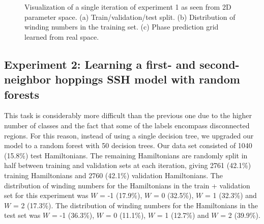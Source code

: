 \documentclass[fleqn,10pt]{wlscirep}
\begin{document}
\begin{figure}
\centering
{}\quad
{}
\caption{Visualization of a single iteration of experiment 1 as seen from 2D parameter space. (a) Train/validation/test split. (b) Distribution of winding numbers in the training set. (c) Phase prediction grid learned from real space.}
\label{figexp1_exp}
\end{figure}

\subsection*{Experiment 2: Learning a first- and second-neighbor hoppings SSH model with random forests}
\label{exp2}

This task is considerably more difficult than the previous one due to the higher number of classes and the fact that some of the labels encompass disconnected regions. For this reason, instead of using a single decision tree, we upgraded our model to a random forest \cite{Breiman2001} with 50 decision trees. Our data set consisted of 1040 (15.8\%) test Hamiltonians. The remaining Hamiltonians are randomly split in half between training and validation sets at each iteration, giving 2761 (42.1\%) training Hamiltonians and 2760 (42.1\%) validation Hamiltonians. The distribution of winding numbers for the Hamiltonians in the train + validation set for this experiment was $W$ = -1 (17.9\%), $W$ = 0 (32.5\%), $W$ = 1 (32.3\%) and $W$ = 2 (17.3\%). The distribution of winding numbers for the Hamiltonians in the test set was $W$ = -1 (36.3\%), $W$ = 0 (11.1\%), $W$ = 1 (12.7\%) and $W$ = 2 (39.9\%).
\end{document}
